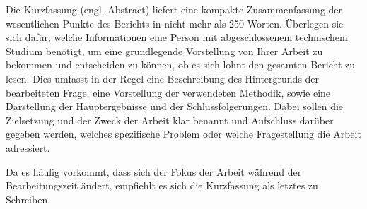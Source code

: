 %
Die Kurzfassung (engl. Abstract) liefert eine kompakte Zusammenfassung der wesentlichen Punkte des Berichts in nicht mehr als 250 Worten. 
Überlegen sie sich dafür, welche Informationen eine Person mit abgeschlossenem technischem Studium benötigt, um eine grundlegende Vorstellung von Ihrer Arbeit zu bekommen und entscheiden zu können, ob es sich lohnt den gesamten Bericht zu lesen.
Dies umfasst in der Regel eine Beschreibung des Hintergrunds der bearbeiteten Frage, eine Vorstellung der verwendeten Methodik, sowie eine Darstellung der Hauptergebnisse und der Schlussfolgerungen.
Dabei sollen die Zielsetzung und der Zweck der Arbeit klar benannt und Aufschluss darüber gegeben werden, welches spezifische Problem oder welche Fragestellung die Arbeit adressiert.
\par
Da es häufig vorkommt, dass sich der Fokus der Arbeit während der Bearbeitungszeit ändert, empfiehlt es sich die Kurzfassung als letztes zu Schreiben.
%